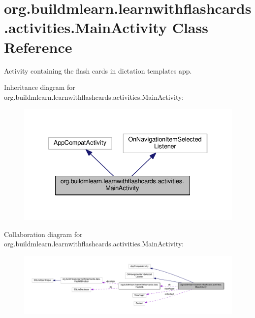 \hypertarget{classorg_1_1buildmlearn_1_1learnwithflashcards_1_1activities_1_1MainActivity}{}\section{org.\+buildmlearn.\+learnwithflashcards.\+activities.\+Main\+Activity Class Reference}
\label{classorg_1_1buildmlearn_1_1learnwithflashcards_1_1activities_1_1MainActivity}


Activity containing the flash cards in dictation template\textquotesingle{}s app.  




Inheritance diagram for org.\+buildmlearn.\+learnwithflashcards.\+activities.\+Main\+Activity\+:
\nopagebreak
\begin{figure}[H]
\begin{center}
\leavevmode
\includegraphics[width=334pt]{classorg_1_1buildmlearn_1_1learnwithflashcards_1_1activities_1_1MainActivity__inherit__graph}
\end{center}
\end{figure}


Collaboration diagram for org.\+buildmlearn.\+learnwithflashcards.\+activities.\+Main\+Activity\+:
\nopagebreak
\begin{figure}[H]
\begin{center}
\leavevmode
\includegraphics[width=350pt]{classorg_1_1buildmlearn_1_1learnwithflashcards_1_1activities_1_1MainActivity__coll__graph}
\end{center}
\end{figure}
